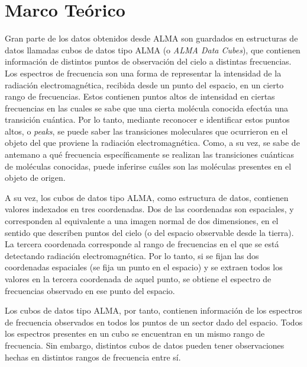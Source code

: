 \chapter{Marco Teórico}


Gran parte de los datos obtenidos desde ALMA son guardados en estructuras de datos llamadas cubos de datos tipo ALMA (o \textit{ALMA Data Cubes}), que contienen información de distintos puntos de observación del cielo a distintas frecuencias. 
Los espectros de frecuencia son una forma de representar la intensidad de la radiación electromagnética, recibida desde un punto del espacio, en un cierto rango de frecuencias. Estos contienen puntos altos de intensidad en ciertas frecuencias en las cuales se sabe que una cierta molécula conocida efectúa una transición cuántica. Por lo tanto, mediante reconocer e identificar estos puntos altos, o \textit{peaks}, se puede saber las transiciones moleculares que ocurrieron en el objeto del que proviene la radiación electromagnética. Como, a su vez, se sabe de antemano a qué frecuencia específicamente se realizan las transiciones cuánticas de moléculas conocidas, puede inferirse cuáles son las moléculas presentes en el objeto de origen.

A su vez, los cubos de datos tipo ALMA, como estructura de datos, contienen valores indexados en tres coordenadas. Dos de las coordenadas son espaciales, y corresponden al equivalente a una imagen normal de dos dimensiones, en el sentido que describen puntos del cielo (o del espacio observable desde la tierra). La tercera coordenada corresponde al rango de frecuencias en el que se está detectando radiación electromagnética. Por lo tanto, si se fijan las dos coordenadas espaciales (se fija un punto en el espacio) y se extraen todos los valores en la tercera coordenada de aquel punto, se obtiene el espectro de frecuencias observado en ese punto del espacio.

Los cubos de datos tipo ALMA, por tanto, contienen información de los espectros de frecuencia observados en todos los puntos de un sector dado del espacio. Todos los espectros presentes en un cubo se encuentran en un mismo rango de frecuencia. Sin embargo, distintos cubos de datos pueden tener observaciones hechas en distintos rangos de frecuencia entre sí.

